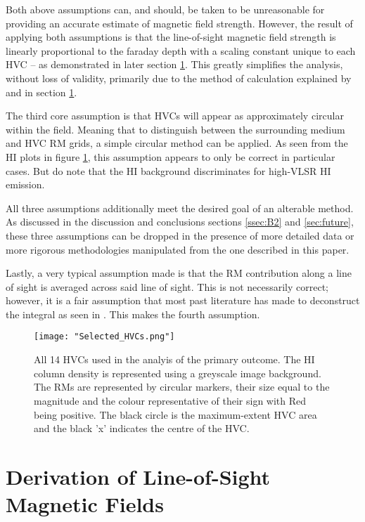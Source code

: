 Both above assumptions can, and should, be taken to be unreasonable for providing an accurate estimate of magnetic field strength. However, the result of applying both assumptions is that the line-of-sight magnetic field strength is linearly proportional to the faraday depth with a scaling constant unique to each HVC – as demonstrated in later section \ref{sec:los_dev}. This greatly simplifies the analysis, without loss of validity, primarily due to the method of calculation explained by \cite{ID27} and in section \ref{sec:los_dev}.


The third core assumption is that HVCs will appear as approximately circular within the field. Meaning that to distinguish between the surrounding medium and HVC RM grids, a simple circular method can be applied. As seen from the HI plots in figure \ref{fig:all_hvcs}, this assumption appears to only be correct in particular cases. But do note that the HI background discriminates for high-VLSR HI emission.


All three assumptions additionally meet the desired goal of an alterable method. As discussed in the discussion and conclusions sections \ref{ssec:B2} and \ref{sec:future}, these three assumptions can be dropped in the presence of more detailed data or more rigorous methodologies manipulated from the one described in this paper.


Lastly, a very typical assumption made is that the RM contribution along a line of sight is averaged across said line of sight. This is not necessarily correct; however, it is a fair assumption that most past literature has made to deconstruct the integral as seen in \cite{ID27, ID3, ID26}. This makes the fourth assumption.

\begin{figure}
    \texttt{[image: "Selected\_HVCs.png"]}
    \centering
    \caption{All 14 HVCs used in the analyis of the primary outcome. The HI column density is represented using a greyscale image background. The RMs are represented by circular markers, their size equal to the magnitude and the colour representative of their sign with Red being positive. The black circle is the maximum-extent HVC area and the black 'x' indicates the centre of the HVC.}
    \label{fig:all_hvcs}
\end{figure}


\section{Derivation of Line-of-Sight Magnetic Fields}
\label{sec:los_dev}

